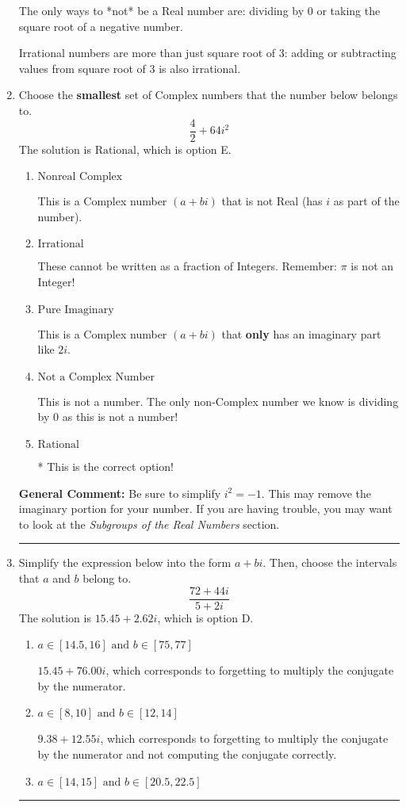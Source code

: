 \documentclass{extbook}[14pt]
\newcommand{\litem}[1]{\item #1

\rule{\textwidth}{0.4pt}}
\begin{document}
\begin{enumerate}
{ The only ways to *not* be a Real number are: dividing by 0 or taking the square root of a negative number. 
 
 Irrational numbers are more than just square root of 3: adding or subtracting values from square root of 3 is also irrational.
}
\litem{
Choose the \textbf{smallest} set of Complex numbers that the number below belongs to.
\[ \frac{4}{2}+64i^2 \]The solution is \( \text{Rational} \), which is option E.\begin{enumerate}[label=\Alph*.]
\item \( \text{Nonreal Complex} \)

This is a Complex number $(a+bi)$ that is not Real (has $i$ as part of the number).
\item \( \text{Irrational} \)

These cannot be written as a fraction of Integers. Remember: $\pi$ is not an Integer!
\item \( \text{Pure Imaginary} \)

This is a Complex number $(a+bi)$ that \textbf{only} has an imaginary part like $2i$.
\item \( \text{Not a Complex Number} \)

This is not a number. The only non-Complex number we know is dividing by 0 as this is not a number!
\item \( \text{Rational} \)

* This is the correct option!
\end{enumerate}

\textbf{General Comment:} Be sure to simplify $i^2 = -1$. This may remove the imaginary portion for your number. If you are having trouble, you may want to look at the \textit{Subgroups of the Real Numbers} section.
}
\litem{
Simplify the expression below into the form $a+bi$. Then, choose the intervals that $a$ and $b$ belong to.
\[ \frac{72 + 44 i}{5 + 2 i} \]The solution is \( 15.45  + 2.62 i \), which is option D.\begin{enumerate}[label=\Alph*.]
\item \( a \in [14.5, 16] \text{ and } b \in [75, 77] \)

 $15.45  + 76.00 i$, which corresponds to forgetting to multiply the conjugate by the numerator.
\item \( a \in [8, 10] \text{ and } b \in [12, 14] \)

 $9.38  + 12.55 i$, which corresponds to forgetting to multiply the conjugate by the numerator and not computing the conjugate correctly.
\item \( a \in [14, 15] \text{ and } b \in [20.5, 22.5] \)


\end{enumerate}}
\end{enumerate}
\end{document}
